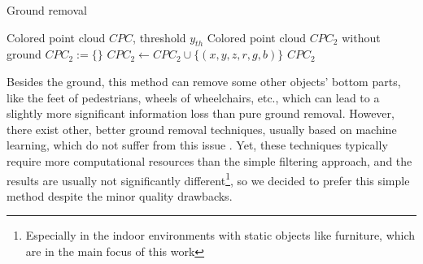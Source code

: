 \begin{algorithm}
    \caption{Ground removal}\label{alg:groundRemoval}
    \begin{algorithmic}
        \Require Colored point cloud $CPC$, threshold $y_{th}$
        \Ensure Colored point cloud $CPC_2$ without ground
        \State $CPC_2 := \{\}$  
         
         
        \State $CPC_2 \leftarrow CPC_2 \cup \{(x,y,z,r,g,b)\}$  
        \EndIf
        \EndFor
        \State\Return $CPC_2$
    \end{algorithmic}
\end{algorithm}

Besides the ground, this method can remove some other objects' bottom parts, like the feet of pedestrians, wheels of wheelchairs, etc., which can lead to a slightly more significant information loss than pure ground removal. However, there exist other, better ground removal techniques, usually based on machine learning, which do not suffer from this issue \cite{groundRemoval1} \cite{groundRemoval2}. Yet, these techniques typically require more computational resources than the simple filtering approach, and the results are usually not significantly different\footnote{Especially in the indoor environments with static objects like furniture, which are in the main focus of this work}, so we decided to prefer this simple method despite the minor quality drawbacks.